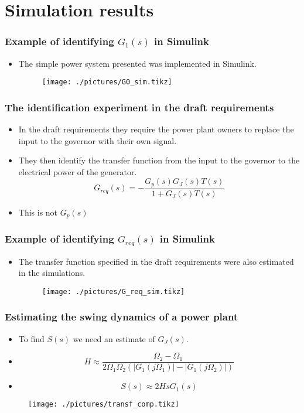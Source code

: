 \section{Simulation results}
\begin{frame}
		\frametitle{Example of identifying $G_1(s)$ in Simulink }
	\begin{itemize}
			\item The simple power system presented was implemented in Simulink.
			\begin{figure}
					\texttt{[image: ./pictures/G0\_sim.tikz]}
			\end{figure}
	\end{itemize}
\end{frame}
\begin{frame}
	\frametitle{The identification experiment in the draft requirements}
	\begin{itemize}[<+->]
			\item In the draft requirements they require the power plant owners to replace the input to the governor with their own signal.
			\item They then identify the transfer function from the input to the governor to the electrical power of the generator.
			\begin{equation}\label{eq:G_req}
				G_{req}(s) = -\frac{G_p(s)G_J(s)T(s)}{1+G_J(s)T(s)}
			\end{equation}
			\item This is not $G_p(s)$
	\end{itemize}
\end{frame}
\begin{frame}
		\frametitle{Example of identifying $G_{req}(s)$ in Simulink }
	\begin{itemize}
			\item The transfer function specified in the draft requirements were also estimated in the simulations.
			\begin{figure}
					\texttt{[image: ./pictures/G\_req\_sim.tikz]}
			\end{figure}
	\end{itemize}
\end{frame}
\begin{frame}
	\frametitle{Estimating the swing dynamics of a power plant}
	\begin{itemize}[<+->]
		\item To find $S(s)$ we need an estimate of $G_J(s)$.
		\item 
			\begin{equation}
				H\approx \frac{\Omega_2 - \Omega_1}{2\Omega_1\Omega_2(|G_1(j\Omega_1)|-|G_1(j\Omega_2)|)}
			\end{equation}
		\item
			\begin{equation}\label{eq:S_ident}
				S(s) \approx 2HsG_1(s)
			\end{equation}
	\end{itemize}
	\begin{figure}
		\texttt{[image: ./pictures/transf\_comp.tikz]}
	\end{figure}
\end{frame}
